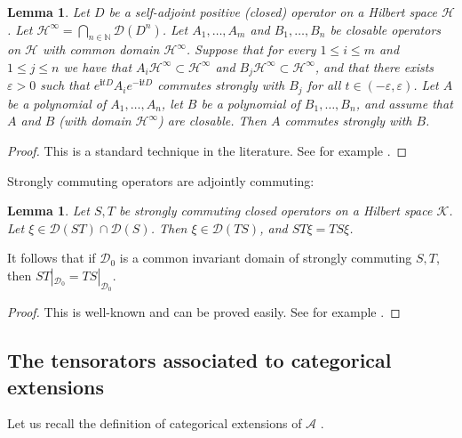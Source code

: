 \documentclass[11pt,b5paper,notitlepage]{article}
\theoremstyle{definition}
\theoremstyle{plain}
\newtheorem{lm}[df]{Lemma}
\newcommand{\mc}{\mathcal}
\newcommand{\Dom}{\scr D}
\newcommand{\scr}{\mathscr}
\newcommand{\im}{\mathbf{i}}
\newcommand{\Nbb}{\mathbb N}
\newcommand{\eps}{\varepsilon}
\numberwithin{equation}{section}
\begin{document}
\begin{lm}\label{lb35}
Let $D$ be a self-adjoint positive (closed) operator on a Hilbert space $\mc H$. Let $\mc H^\infty=\bigcap_{n\in\Nbb}\Dom(D^n)$. Let $A_1,\dots,A_m$ and $B_1,\dots,B_n$ be closable operators on $\mc H$ with common domain $\mc H^\infty$. Suppose that for every $1\leq i\leq m$ and $1\leq j\leq n$ we have that $A_i\mc H^\infty\subset \mc H^\infty$ and $B_j\mc H^\infty\subset\mc H^\infty$, and that there exists $\eps>0$ such that $e^{\im tD}A_i e^{-\im tD}$ commutes strongly with $B_j$ for all $t\in (-\eps,\eps)$. Let $A$ be a polynomial of $A_1,\dots,A_n$, let $B$ be a polynomial of $B_1,\dots,B_n$, and assume that $A$ and $B$ (with domain $\mc H^\infty$) are closable. Then $A$ commutes strongly with $B$.
\end{lm}

\begin{proof}
This is a standard technique in the literature. See for example \cite[Lem. 4.17]{Gui21a}.
\end{proof}

Strongly commuting operators are adjointly commuting:
\begin{lm}\label{lb14}
Let $S,T$ be strongly commuting closed operators on a Hilbert space $\mc K$. Let $\xi\in\Dom(ST)\cap\Dom(S)$. Then $\xi\in\Dom(TS)$, and $ST\xi=TS\xi$.
\end{lm}

It follows that if $\Dom_0$ is a common invariant domain of strongly commuting $S,T$, then $ST|_{\Dom_0}=TS|_{\Dom_0}$.

\begin{proof}
This is well-known and can be proved easily. See for example \cite[Prop. 1.A.5]{Gui20}.
\end{proof}





\subsection{The tensorators associated to categorical extensions}

Let us recall the definition of categorical extensions of $\mc A$ \cite{Gui21a}.
\end{document}
